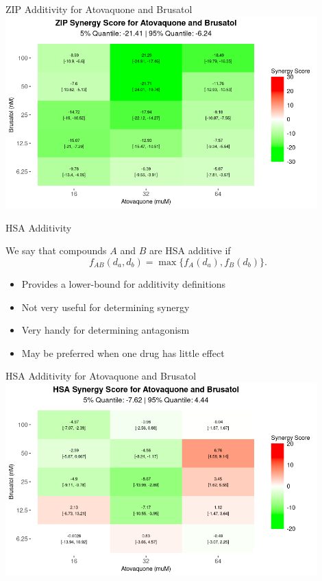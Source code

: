 \documentclass{beamer}
\begin{document}
\begin{frame}{ZIP Additivity for Atovaquone and Brusatol}
    \centering
    \includegraphics[width=0.9\textwidth]{figs/zip-heatmap.png}
\end{frame}

\begin{frame}{HSA Additivity}
    \begin{definition}
        We say that compounds $A$ and $B$ are \alert{HSA additive} if
        \[ 
            f_{AB}(d_a, d_b) = \max\{f_A(d_a),f_B(d_b)\}.
        \]
    \end{definition}

    \begin{itemize}
        \item Provides a \alert{lower-bound} for additivity definitions
        \item Not very useful for determining synergy 
        \item Very handy for determining antagonism
        \item May be preferred when one drug has little effect
    \end{itemize}
\end{frame}

\begin{frame}{HSA Additivity for Atovaquone and Brusatol}
    \centering
    \includegraphics[width=0.9\textwidth]{figs/hsa-heatmap.png}
\end{frame}
\end{document}
